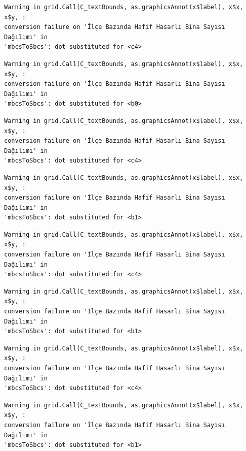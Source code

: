 \documentclass[
  11pt,
  a4paper,
  DIV=11,
  numbers=noendperiod]{scrartcl}
\begin{document}
\begin{verbatim}
Warning in grid.Call(C_textBounds, as.graphicsAnnot(x$label), x$x, x$y, :
conversion failure on 'İlçe Bazında Hafif Hasarlı Bina Sayısı Dağılımı' in
'mbcsToSbcs': dot substituted for <c4>
\end{verbatim}

\begin{verbatim}
Warning in grid.Call(C_textBounds, as.graphicsAnnot(x$label), x$x, x$y, :
conversion failure on 'İlçe Bazında Hafif Hasarlı Bina Sayısı Dağılımı' in
'mbcsToSbcs': dot substituted for <b0>
\end{verbatim}

\begin{verbatim}
Warning in grid.Call(C_textBounds, as.graphicsAnnot(x$label), x$x, x$y, :
conversion failure on 'İlçe Bazında Hafif Hasarlı Bina Sayısı Dağılımı' in
'mbcsToSbcs': dot substituted for <c4>
\end{verbatim}

\begin{verbatim}
Warning in grid.Call(C_textBounds, as.graphicsAnnot(x$label), x$x, x$y, :
conversion failure on 'İlçe Bazında Hafif Hasarlı Bina Sayısı Dağılımı' in
'mbcsToSbcs': dot substituted for <b1>
\end{verbatim}

\begin{verbatim}
Warning in grid.Call(C_textBounds, as.graphicsAnnot(x$label), x$x, x$y, :
conversion failure on 'İlçe Bazında Hafif Hasarlı Bina Sayısı Dağılımı' in
'mbcsToSbcs': dot substituted for <c4>
\end{verbatim}

\begin{verbatim}
Warning in grid.Call(C_textBounds, as.graphicsAnnot(x$label), x$x, x$y, :
conversion failure on 'İlçe Bazında Hafif Hasarlı Bina Sayısı Dağılımı' in
'mbcsToSbcs': dot substituted for <b1>
\end{verbatim}

\begin{verbatim}
Warning in grid.Call(C_textBounds, as.graphicsAnnot(x$label), x$x, x$y, :
conversion failure on 'İlçe Bazında Hafif Hasarlı Bina Sayısı Dağılımı' in
'mbcsToSbcs': dot substituted for <c4>
\end{verbatim}

\begin{verbatim}
Warning in grid.Call(C_textBounds, as.graphicsAnnot(x$label), x$x, x$y, :
conversion failure on 'İlçe Bazında Hafif Hasarlı Bina Sayısı Dağılımı' in
'mbcsToSbcs': dot substituted for <b1>
\end{verbatim}
\end{document}
